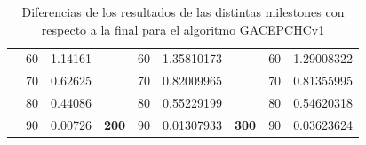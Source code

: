 \begin{table}[h]
\begin{tabular}{|ccrccrccr|}
\rowcolor[HTML]{DDFDFF} 
\multicolumn{1}{|c|}{\cellcolor[HTML]{FFFFC7}}                                & \multicolumn{1}{c|}{\cellcolor[HTML]{DDFDFF}60}        & \multicolumn{1}{r|}{\cellcolor[HTML]{DDFDFF}1.14161}    & \multicolumn{1}{c|}{\cellcolor[HTML]{FFFFC7}}                                & \multicolumn{1}{c|}{\cellcolor[HTML]{DDFDFF}60}        & \multicolumn{1}{r|}{\cellcolor[HTML]{DDFDFF}1.35810173} & \multicolumn{1}{c|}{\cellcolor[HTML]{FFFFC7}}                                & \multicolumn{1}{c|}{\cellcolor[HTML]{DDFDFF}60}        & 1.29008322                                              \\ \cline{2-3} \cline{5-6} \cline{8-9} 
\rowcolor[HTML]{DAE8FC} 
\multicolumn{1}{|c|}{\cellcolor[HTML]{FFFFC7}}                                & \multicolumn{1}{c|}{\cellcolor[HTML]{DAE8FC}70}        & \multicolumn{1}{r|}{\cellcolor[HTML]{DAE8FC}0.62625}    & \multicolumn{1}{c|}{\cellcolor[HTML]{FFFFC7}}                                & \multicolumn{1}{c|}{\cellcolor[HTML]{DAE8FC}70}        & \multicolumn{1}{r|}{\cellcolor[HTML]{DAE8FC}0.82009965} & \multicolumn{1}{c|}{\cellcolor[HTML]{FFFFC7}}                                & \multicolumn{1}{c|}{\cellcolor[HTML]{DAE8FC}70}        & 0.81355995                                              \\ \cline{2-3} \cline{5-6} \cline{8-9} 
\rowcolor[HTML]{DDFDFF} 
\multicolumn{1}{|c|}{\cellcolor[HTML]{FFFFC7}}                                & \multicolumn{1}{c|}{\cellcolor[HTML]{DDFDFF}80}        & \multicolumn{1}{r|}{\cellcolor[HTML]{DDFDFF}0.44086}    & \multicolumn{1}{c|}{\cellcolor[HTML]{FFFFC7}}                                & \multicolumn{1}{c|}{\cellcolor[HTML]{DDFDFF}80}        & \multicolumn{1}{r|}{\cellcolor[HTML]{DDFDFF}0.55229199} & \multicolumn{1}{c|}{\cellcolor[HTML]{FFFFC7}}                                & \multicolumn{1}{c|}{\cellcolor[HTML]{DDFDFF}80}        & 0.54620318                                              \\ \cline{2-3} \cline{5-6} \cline{8-9} 
\rowcolor[HTML]{DAE8FC} 
\multicolumn{1}{|c|}{\multirow{-13}{*}{\cellcolor[HTML]{FFFFC7}\textbf{100}}} & \multicolumn{1}{c|}{\cellcolor[HTML]{DAE8FC}90}        & \multicolumn{1}{r|}{\cellcolor[HTML]{DAE8FC}0.00726}    & \multicolumn{1}{c|}{\multirow{-13}{*}{\cellcolor[HTML]{FFFFC7}\textbf{200}}} & \multicolumn{1}{c|}{\cellcolor[HTML]{DAE8FC}90}        & \multicolumn{1}{r|}{\cellcolor[HTML]{DAE8FC}0.01307933} & \multicolumn{1}{c|}{\multirow{-13}{*}{\cellcolor[HTML]{FFFFC7}\textbf{300}}} & \multicolumn{1}{c|}{\cellcolor[HTML]{DAE8FC}90}        & 0.03623624                                              \\ \hline
\end{tabular}
\caption{\label{DiferenciasGACEPCHCv1}Diferencias de los resultados de las distintas milestones con respecto a la final para el algoritmo GACEPCHCv1}
\end{table}

